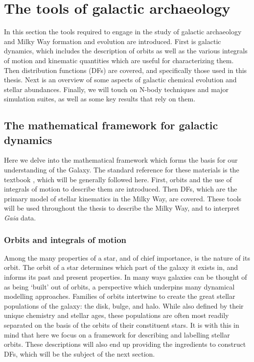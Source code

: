 \section{The tools of galactic archaeology}

In this section the tools required to engage in the study of galactic archaeology and Milky Way formation and evolution are introduced. First is galactic dynamics, which includes the description of orbits as well as the various integrals of motion and kinematic quantities which are useful for characterizing them. Then distribution functions (DFs) are covered, and specifically those used in this thesis. Next is an overview of some aspects of galactic chemical evolution and stellar abundances. Finally, we will touch on N-body techniques and major simulation suites, as well as some key results that rely on them. 

\subsection{The mathematical framework for galactic dynamics}

Here we delve into the mathematical framework which forms the basis for our understanding of the Galaxy. The standard reference for these materials is the textbook \textcite{binney08}, which will be generally followed here. First, orbits and the use of integrals of motion to describe them are introduced. Then DFs, which are the primary model of stellar kinematics in the Milky Way, are covered. These tools will be used throughout the thesis to describe the Milky Way, and to interpret \textit{Gaia} data.

\subsubsection{Orbits and integrals of motion}

Among the many properties of a star, and of chief importance, is the nature of its orbit. The orbit of a star determines which part of the galaxy it exists in, and informs its past and present properties. In many ways galaxies can be thought of as being `built' out of orbits, a perspective which underpins many dynamical modelling approaches. Families of orbits intertwine to create the great stellar populations of the galaxy: the disk, bulge, and halo. While also defined by their unique chemistry and stellar ages, these populations are often most readily separated on the basis of the orbits of their constituent stars. It is with this in mind that here we focus on a framework for describing and labelling stellar orbits. These descriptions will also end up providing the ingredients to construct DFs, which will be the subject of the next section.

